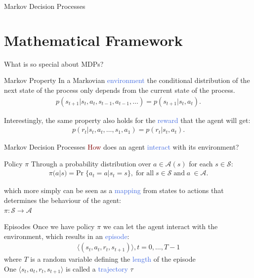 \documentclass{beamer}
\begin{document}

\begin{frame}{Markov Decision Processes}
	\section{Mathematical Framework}
	What is so special about MDPs?
	\begin{block}{Markov Property}
		In a Markovian \textcolor{RoyalBlue}{environment} the conditional distribution of the next state of the process only depends from the current state of the process. 		\centering  	
		\begin{align*}
		p(s_{t+1}|s_t, a_t, s_{t-1}, a_{t-1}, \ldots) = p(s_{t+1} | s_t, a_t).
		\end{align*}
	\end{block}

	Interestingly, the same property also holds for the \textcolor{RoyalBlue}{reward} that the agent will get: 
	\begin{align*}
			p(r_t| s_t, a_t, \ldots, s_1, a_1) = p(r_t|s_t,a_t).
	\end{align*}
\end{frame}

\begin{frame}{Markov Decision Processes}
	\textcolor{Maroon}{How} does an agent \textcolor{RoyalBlue}{interact} with its environment?
	
	\begin{block}{Policy $\pi$}		
		Through a probability distribution over $a \in \mathcal{A}(s)$ for each $s \in \mathcal{S}$:
		\centering
		\begin{align*}
			\pi(a|s) = \text{Pr}\; \{a_t = a | s_t = s\}, \; \text{for all}\; s \in \mathcal{S}\; \text{and}\; a\ \in \mathcal{A}. 
		\end{align*}

	\end{block}
	
	which more simply can be seen as a \textcolor{RoyalBlue}{mapping} from states to actions that determines the behaviour of the agent: \\ 
	\centering $\pi: \mathcal{S}\rightarrow \mathcal{A}$ \\	
\end{frame}

\begin{frame}{Episodes}
	Once we have policy $\pi$ we can let the agent interact with the environment, which results in an \textcolor{RoyalBlue}{episode}:
	\centering
	\begin{align*}
		\langle(s_t,a_t,r_t,s_{t+1})\rangle, t=0,\ldots,T-1
	\end{align*}
	where $T$ is a random variable defining the \textcolor{RoyalBlue}{length} of the episode \\

	\bigskip
	One $\langle s_t,a_t,r_t,s_{t+1} \rangle$ is called a \textcolor{RoyalBlue}{trajectory} $\tau$
\end{frame}
\end{document}
